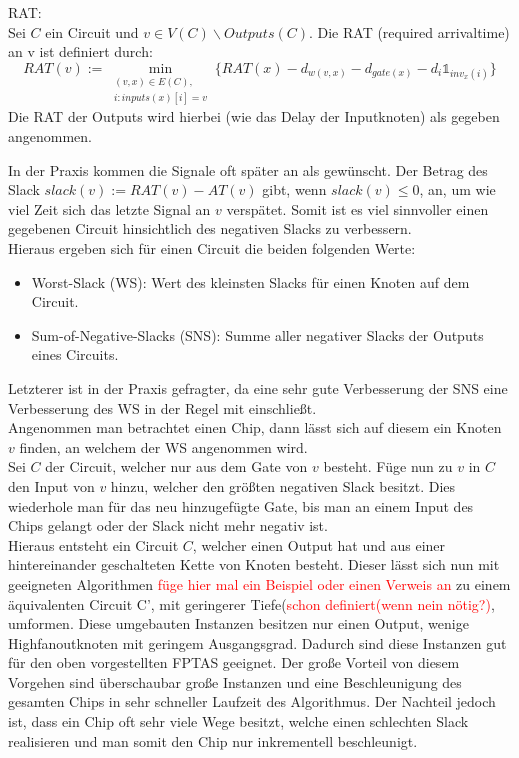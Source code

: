 \documentclass[11pt, a4paper, german]{article}
\begin{document}
\begin{definition}{RAT:}\\
	Sei $C$ ein Circuit und $v \in V(C)\backslash  Outputs(C)$. Die RAT (required arrivaltime) an v ist definiert durch:
	\[   RAT(v) := \min\limits_{ \substack{(v,x)\in E(C), \\ i: inputs(x)[i] = v }} \{ RAT(x) - d_{w(v,x)} - d_{gate(x)} - d_{i} \mathbb{1}_{inv_x(i)} \}\] 
	Die RAT der Outputs wird hierbei (wie das Delay der Inputknoten) als gegeben angenommen. 
\end{definition}

In der Praxis kommen die Signale oft später an als gewünscht. Der Betrag des Slack $slack(v) := RAT(v) - AT(v)$ gibt, wenn $slack(v) \leq 0 $, an, um wie viel Zeit sich das letzte Signal an $v$ verspätet. Somit ist es viel sinnvoller einen gegebenen Circuit hinsichtlich des negativen Slacks zu verbessern. \\
Hieraus ergeben sich für einen Circuit die beiden folgenden Werte: 
\begin{itemize}
	\item Worst-Slack (WS): Wert des kleinsten Slacks für einen Knoten auf dem Circuit.
	\item Sum-of-Negative-Slacks (SNS): Summe aller negativer Slacks der Outputs eines Circuits.
\end{itemize}
Letzterer ist in der Praxis gefragter, da eine sehr gute Verbesserung der SNS eine Verbesserung des WS in der Regel mit einschließt. \\

Angenommen man betrachtet einen Chip, dann lässt sich auf diesem ein Knoten $v$ finden, an welchem der WS angenommen wird.\\
Sei $C$ der Circuit, welcher nur aus dem Gate von $v$ besteht. Füge nun zu $v$ in $C$ den Input von $v$ hinzu, welcher den größten negativen Slack besitzt. Dies wiederhole man für das neu hinzugefügte Gate, bis man an einem Input des Chips gelangt oder der Slack nicht mehr negativ ist. \\
Hieraus entsteht ein Circuit $C$, welcher einen Output hat und aus einer hintereinander geschalteten Kette von Knoten besteht. Dieser lässt sich nun mit geeigneten Algorithmen \textcolor{red}{füge hier mal ein Beispiel oder einen Verweis an} zu einem äquivalenten Circuit C', mit geringerer Tiefe(\textcolor{red}{schon definiert(wenn nein nötig?)}, umformen. Diese umgebauten Instanzen besitzen nur einen Output, wenige Highfanoutknoten mit geringem Ausgangsgrad. Dadurch sind diese Instanzen gut für den oben vorgestellten FPTAS geeignet. Der große Vorteil von diesem Vorgehen sind überschaubar große Instanzen und eine Beschleunigung des gesamten Chips in sehr schneller Laufzeit des Algorithmus. Der Nachteil jedoch ist, dass ein Chip oft sehr viele Wege besitzt, welche einen schlechten Slack realisieren und man somit den Chip nur inkrementell beschleunigt.\\
\end{document}
